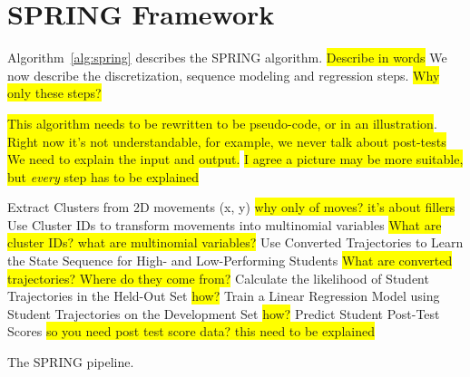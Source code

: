 \documentclass{sigchi}
\newcommand{\hl}[1]{\colorbox{yellow}{#1}}
\def\algname{SPRING\xspace}
\begin{document}


\section{SPRING Framework}
	Algorithm~\ref{alg:spring} describes the SPRING algorithm.
	\hl{Describe in words}
	We now describe  the discretization, sequence modeling and regression steps.  
	\hl{Why only these steps?}

	\hl{This algorithm needs to be rewritten to be pseudo-code, or in an illustration}.
	\hl{ Right now it's not understandable, for example, we never talk about post-tests}
	\hl{We need to explain the input and output.}
	\hl{I agree a  picture may be more suitable, but \textit{every} step has to be explained}
	
\begin{algorithm}
\begin{algorithmic}
			\State Extract Clusters from 2D movements (x, y) \hl{why only of moves? it's about fillers}
			\State Use Cluster IDs to transform movements into multinomial variables  \hl{What are cluster IDs? what are multinomial variables?}
			\State Use Converted Trajectories to Learn the State Sequence for High- and Low-Performing Students \hl{What are converted trajectories? Where do they come from?}
			\State Calculate the likelihood of Student Trajectories in the Held-Out Set  \hl{how?}
			\State Train a Linear Regression Model using Student Trajectories on the Development Set \hl{how?}
			\State Predict Student Post-Test Scores \hl{so you need post test score data? this need to be explained}
\end{algorithmic}
\caption{The \algname pipeline. \label{alg:spring}}
\end{algorithm}
\end{document}
